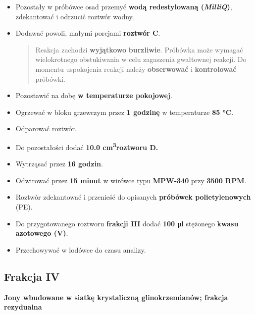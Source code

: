 \documentclass[
  letterpaper,
  DIV=11,
  numbers=noendperiod]{scrreprt}
\begin{document}
\begin{itemize}
\item
  Pozostały w próbówce osad przemyć \textbf{wodą redestylowaną
  (\emph{MilliQ})}, zdekantować i odrzucić roztwór wodny.
\item
  Dodawać powoli, małymi porcjami \textbf{roztwór C}.

  \begin{quote}
  Reakcja zachodzi \textbf{wyjątkowo} \textbf{burzliwie}. Próbówka może
  wymagać wielokrotnego obstukiwania w celu zagaszenia gwałtownej
  reakcji. Do momentu uspokojenia reakcji należy \textbf{obserwować} i
  \textbf{kontrolować} próbówki.
  \end{quote}
\item
  Pozostawić na dobę \textbf{w temperaturze pokojowej}.
\item
  Ogrzewać w bloku grzewczym przez \textbf{1 godzinę} w temperaturze
  \textbf{85 °C}.
\item
  Odparować roztwór.
\item
  Do pozostałości dodać \textbf{10.0 cm\textsuperscript{3}roztworu D.}
\item
  Wytrząsać przez \textbf{16 godzin}.
\item
  Odwirować przez \textbf{15 minut} w wirówce typu \textbf{MPW-340} przy
  \textbf{3500 RPM}.
\item
  Roztwór zdekantować i przenieść do opisanych \textbf{próbówek
  polietylenowych} (PE).
\item
  Do przygotowanego roztworu \textbf{frakcji III} dodać \textbf{100 μl}
  stężonego \textbf{kwasu azotowego (V)}.
\item
  Przechowywać w lodówce do czasu analizy.
\end{itemize}

\hypertarget{frakcja-iv}{%
\subsection{Frakcja IV}\label{frakcja-iv}}

\textbf{Jony wbudowane w siatkę krystaliczną glinokrzemianów; frakcja
rezydualna}
\end{document}
